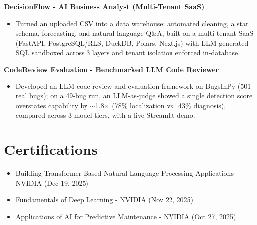 \documentclass[11pt,a4paper]{article}
\newcommand{\proj}[1]{\textbf{#1}\par}
\begin{document}
\proj{DecisionFlow - AI Business Analyst (Multi-Tenant SaaS)}
\begin{itemize}
  \item Turned an uploaded CSV into a data warehouse: automated cleaning, a star schema, forecasting, and
        natural-language Q\&A, built on a multi-tenant SaaS (FastAPI, PostgreSQL/RLS, DuckDB, Polars,
        Next.js) with LLM-generated SQL sandboxed across 3 layers and tenant isolation enforced in-database.
\end{itemize}

\proj{CodeReview Evaluation - Benchmarked LLM Code Reviewer}
\begin{itemize}
  \item Developed an LLM code-review and evaluation framework on BugsInPy (501 real bugs); on a 49-bug run,
        an LLM-as-judge showed a single detection score overstates capability by $\sim$1.8$\times$
        (78\% localization vs.\ 43\% diagnosis), compared across 3 model tiers, with a live Streamlit demo.
\end{itemize}

\section{Certifications}
\begin{itemize}
  \item Building Transformer-Based Natural Language Processing Applications - NVIDIA {\color{muted}(Dec 19, 2025)}
  \item Fundamentals of Deep Learning - NVIDIA {\color{muted}(Nov 22, 2025)}
  \item Applications of AI for Predictive Maintenance - NVIDIA {\color{muted}(Oct 27, 2025)}
\end{itemize}

\end{document}

